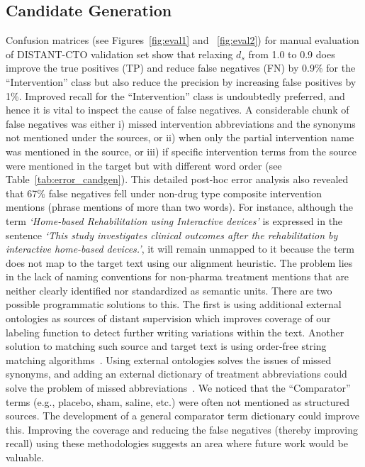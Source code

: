 \documentclass[11pt]{article}
\begin{document}
\subsection{Candidate Generation }
\label{subsec:cand_gen}
%
Confusion matrices (see Figures~\ref{fig:eval1} and ~\ref{fig:eval2}) for manual evaluation of DISTANT-CTO validation set show that relaxing $d_{s}$ from 1.0 to 0.9 does improve the true positives (TP) and reduce false negatives (FN) by 0.9\% for the ``Intervention'' class but also reduce the precision by increasing false positives by 1\%.
Improved recall for the ``Intervention'' class is undoubtedly preferred, and hence it is vital to inspect the cause of false negatives.
A considerable chunk of false negatives was either i) missed intervention abbreviations and the synonyms not mentioned under the sources, or ii) when only the partial intervention name was mentioned in the source, or iii) if specific intervention terms from the source were mentioned in the target but with different word order (see Table~\ref{tab:error_candgen}).
This detailed post-hoc error analysis also revealed that 67\% false negatives fell under non-drug type composite intervention mentions (phrase mentions of more than two words).
For instance, although the term \textit{`Home-based Rehabilitation using Interactive devices'} is expressed in the sentence \textit{`This study investigates clinical outcomes after the rehabilitation by interactive home-based devices.'}, it will remain unmapped to it because the term does not map to the target text using our alignment heuristic.
The problem lies in the lack of naming conventions for non-pharma treatment mentions that are neither clearly identified nor standardized as semantic units\cite{dhrangadhariya2021end}.
There are two possible programmatic solutions to this.
The first is using additional external ontologies as sources of distant supervision which improves coverage of our labeling function to detect further writing variations within the text.
Another solution to matching such source and target text is using order-free string matching algorithms~\cite{apostolico1992combinatorial}.
Using external ontologies solves the issues of missed synonyms, and adding an external dictionary of treatment abbreviations could solve the problem of missed abbreviations~\cite{fries2021ontology}.
We noticed that the ``Comparator'' terms (e.g., placebo, sham, saline, etc.) were often not mentioned as structured sources.
The development of a general comparator term dictionary could improve this.
Improving the coverage and reducing the false negatives (thereby improving recall) using these methodologies suggests an area where future work would be valuable.
\end{document}
